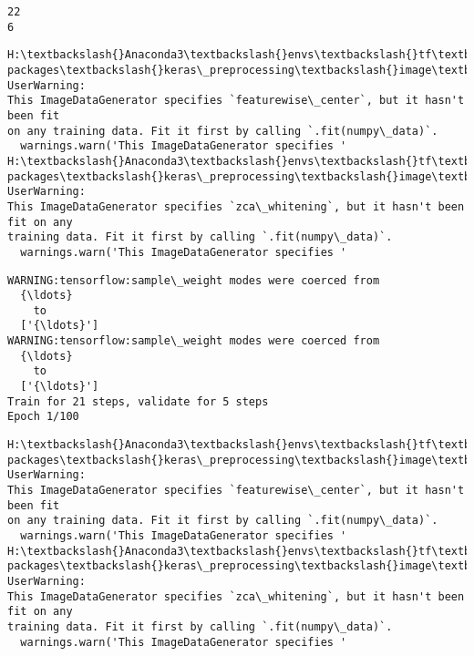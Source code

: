 \documentclass[11pt]{article}
\begin{document}
    \begin{Verbatim}[commandchars=\\\{\}]
22
6
    \end{Verbatim}

    \begin{Verbatim}[commandchars=\\\{\}]
H:\textbackslash{}Anaconda3\textbackslash{}envs\textbackslash{}tf\textbackslash{}lib\textbackslash{}site-
packages\textbackslash{}keras\_preprocessing\textbackslash{}image\textbackslash{}image\_data\_generator.py:716: UserWarning:
This ImageDataGenerator specifies `featurewise\_center`, but it hasn't been fit
on any training data. Fit it first by calling `.fit(numpy\_data)`.
  warnings.warn('This ImageDataGenerator specifies '
H:\textbackslash{}Anaconda3\textbackslash{}envs\textbackslash{}tf\textbackslash{}lib\textbackslash{}site-
packages\textbackslash{}keras\_preprocessing\textbackslash{}image\textbackslash{}image\_data\_generator.py:735: UserWarning:
This ImageDataGenerator specifies `zca\_whitening`, but it hasn't been fit on any
training data. Fit it first by calling `.fit(numpy\_data)`.
  warnings.warn('This ImageDataGenerator specifies '
    \end{Verbatim}

    \begin{Verbatim}[commandchars=\\\{\}]
WARNING:tensorflow:sample\_weight modes were coerced from
  {\ldots}
    to
  ['{\ldots}']
WARNING:tensorflow:sample\_weight modes were coerced from
  {\ldots}
    to
  ['{\ldots}']
Train for 21 steps, validate for 5 steps
Epoch 1/100
    \end{Verbatim}

    \begin{Verbatim}[commandchars=\\\{\}]
H:\textbackslash{}Anaconda3\textbackslash{}envs\textbackslash{}tf\textbackslash{}lib\textbackslash{}site-
packages\textbackslash{}keras\_preprocessing\textbackslash{}image\textbackslash{}image\_data\_generator.py:716: UserWarning:
This ImageDataGenerator specifies `featurewise\_center`, but it hasn't been fit
on any training data. Fit it first by calling `.fit(numpy\_data)`.
  warnings.warn('This ImageDataGenerator specifies '
H:\textbackslash{}Anaconda3\textbackslash{}envs\textbackslash{}tf\textbackslash{}lib\textbackslash{}site-
packages\textbackslash{}keras\_preprocessing\textbackslash{}image\textbackslash{}image\_data\_generator.py:735: UserWarning:
This ImageDataGenerator specifies `zca\_whitening`, but it hasn't been fit on any
training data. Fit it first by calling `.fit(numpy\_data)`.
  warnings.warn('This ImageDataGenerator specifies '
    \end{Verbatim}
\end{document}
